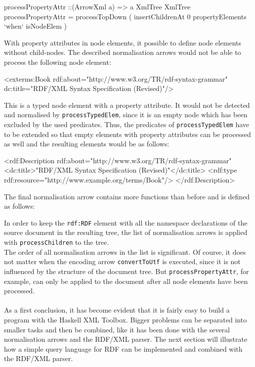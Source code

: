 \documentclass[11pt,a4paper,headsepline, bibtotoc]{scrreprt}
\begin{document}
\clearpage
\begin{code}[caption={Processing Property Attributes}]
processPropertyAttr ::(ArrowXml a) => a XmlTree XmlTree
processPropertyAttr 
  = processTopDown (
      insertChildrenAt 0  propertyElements 
      `when` isNodeElem )
\end{code}
With property attributes in node elements, it possible to define node elements without child-nodes. The described normalisation arrows would not be able to process the following node element:
\begin{blank}
<exterms:Book rdf:about="http://www.w3.org/TR/rdf-syntax-grammar"
              dc:title="RDF/XML Syntax Specification (Revised)"/>
\end{blank}
This is a typed node element with a property attribute. It would not be detected and normalised by \texttt{processTypedElem}, since it is an empty node which has been excluded by the used predicates. Thus, the predicates of \texttt{processTypedElem} have to be extended so that empty elements with property attributes can be processed as well and the resulting elements would be as follows:
\begin{blank}
<rdf:Description rdf:about="http://www.w3.org/TR/rdf-syntax-grammar"
  <dc:title>"RDF/XML Syntax Specification (Revised)"</dc:title>
  <rdf:type rdf:resource="http://www.example.org/terms/Book"/>
</rdf:Description>
\end{blank}
The final normalisation arrow contains more functions than before and is defined as follows:
In order to keep the \texttt{rdf:RDF} element with all the namespace declarations of the source document in the resulting tree, the list of normalisation arrows is applied  with \texttt{process\-Children} to the tree.\\ 
The order of all normalisation arrows in the list is significant. Of course, it does not matter when the encoding arrow \texttt{convertToUtf} is executed, since it is not influenced by the structure of the document tree. But \texttt{processPropertyAttr}, for example, can only be applied to the document after all node elements have been processed.\\
\\
As a first conclusion, it has become evident that it is fairly easy to build a program with the Haskell XML Toolbox. Bigger problems can be separated into smaller tasks and then be combined, like it has been done with the several normalisation arrows and the RDF/XML parser. The next section will illustrate how a simple query language for RDF can be implemented and combined with the RDF/XML parser.  
\end{document}
